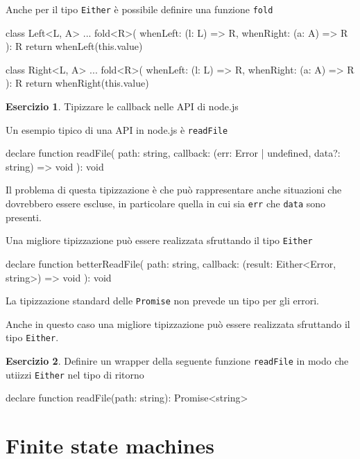 \documentclass[12pt]{article}
\theoremstyle{definition}
\newtheorem{exercise}{Esercizio}[subsection]
\newenvironment{code}
  {\vspace{0.5cm} \VerbatimEnvironment\begin{typescriptcode}}
  {\end{typescriptcode} \vspace{0.2cm}}
\begin{document}
Anche per il tipo \texttt{Either} è possibile definire una funzione \texttt{fold}

\begin{code}
class Left<L, A> {
  ...
  fold<R>(
    whenLeft: (l: L) => R,
    whenRight: (a: A) => R
  ): R {
    return whenLeft(this.value)
  }
}

class Right<L, A> {
  ...
  fold<R>(
    whenLeft: (l: L) => R,
    whenRight: (a: A) => R
  ): R {
    return whenRight(this.value)
  }
}
\end{code}

\begin{exercise}
Tipizzare le callback nelle API di node.js

Un esempio tipico di una API in node.js è \texttt{readFile}

\begin{code}
declare function readFile(
  path: string,
  callback: (err: Error | undefined, data?: string) => void
): void
\end{code}

Il problema di questa tipizzazione è che può rappresentare anche situazioni che dovrebbero essere escluse, in particolare
quella in cui sia \texttt{err} che \texttt{data} sono presenti.

Una migliore tipizzazione può essere realizzata sfruttando il tipo \texttt{Either}

\begin{code}
declare function betterReadFile(
  path: string,
  callback: (result: Either<Error, string>) => void
): void
\end{code}
\end{exercise}

La tipizzazione standard delle \texttt{Promise} non prevede un tipo per gli errori.

Anche in questo caso una migliore tipizzazione può essere realizzata sfruttando il tipo \texttt{Either}.

\begin{exercise}
Definire un wrapper della seguente funzione \texttt{readFile} in modo che utiizzi \texttt{Either} nel tipo di ritorno

\begin{code}
declare function readFile(path: string): Promise<string>
\end{code}
\end{exercise}

\newpage
\section{Finite state machines}
\end{document}
